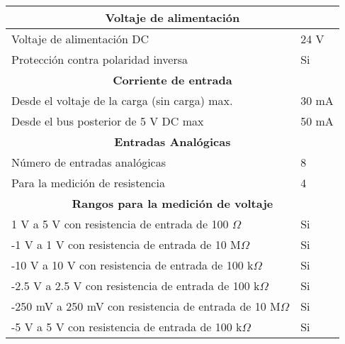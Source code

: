 \newpage


\begin{table}[ht]
\centering
\begin{tabular}{|l|l|}
\hline
\multicolumn{2}{|c|}{\textbf{Voltaje de alimentación}}                                                     \\ \hline
\multicolumn{1}{|l|}{Voltaje de alimentación DC}                           & \multicolumn{1}{l|}{24 V}  \\ \hline
\multicolumn{1}{|l|}{Protección contra polaridad inversa}                  & \multicolumn{1}{l|}{Si}    \\ \hline
\multicolumn{2}{|c|}{\textbf{Corriente de entrada}}                                                     \\ \hline
\multicolumn{1}{|l|}{Desde el voltaje de la carga (sin carga) max.}        & \multicolumn{1}{l|}{30 mA} \\ \hline
\multicolumn{1}{|l|}{Desde el bus posterior de 5 V DC max}                 & \multicolumn{1}{l|}{50 mA} \\ \hline
\multicolumn{2}{|c|}{\textbf{Entradas Analógicas}}                                                      \\ \hline
\multicolumn{1}{|l|}{Número de entradas analógicas}                        & \multicolumn{1}{l|}{8}     \\ \hline
\multicolumn{1}{|l|}{Para la medición de resistencia}                      & \multicolumn{1}{l|}{4}     \\ \hline
\multicolumn{2}{|c|}{\textbf{Rangos para la medición de voltaje}}                                       \\ \hline
\multicolumn{1}{|l|}{1 V a 5 V con resistencia de entrada de 100 $\Omega$}        & \multicolumn{1}{l|}{Si}    \\ \hline
\multicolumn{1}{|l|}{-1 V a 1 V con resistencia de entrada de 10 M$\Omega$}       & \multicolumn{1}{l|}{Si}    \\ \hline
\multicolumn{1}{|l|}{-10 V a 10 V con resistencia de entrada de 100 k$\Omega$}    & \multicolumn{1}{l|}{Si}    \\ \hline
\multicolumn{1}{|l|}{-2.5 V a 2.5 V con resistencia de entrada de 100 k$\Omega$}  & \multicolumn{1}{l|}{Si}    \\ \hline
\multicolumn{1}{|l|}{-250 mV a 250 mV con resistencia de entrada de 10 M$\Omega$} & \multicolumn{1}{l|}{Si}    \\ \hline
\multicolumn{1}{|l|}{-5 V a 5 V con resistencia de entrada de 100 k$\Omega$}      & \multicolumn{1}{l|}{Si}    \\ \hline

\end{tabular}
\end{table}
